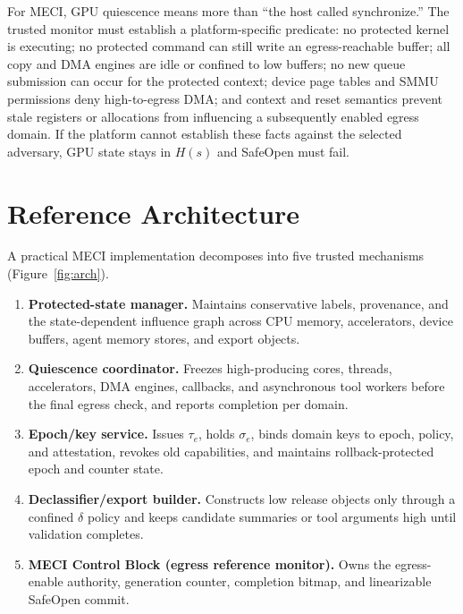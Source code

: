 \documentclass[11pt,letterpaper]{article}
\theoremstyle{plain}
\theoremstyle{definition}
\begin{document}
For MECI, GPU quiescence means more than ``the host called synchronize.'' The trusted monitor must establish a platform-specific predicate: no protected kernel is executing; no protected command can still write an egress-reachable buffer; all copy and DMA engines are idle or confined to low buffers; no new queue submission can occur for the protected context; device page tables and SMMU permissions deny high-to-egress DMA; and context and reset semantics prevent stale registers or allocations from influencing a subsequently enabled egress domain. If the platform cannot establish these facts against the selected adversary, GPU state stays in $H(s)$ and SafeOpen must fail.

\section{Reference Architecture}\label{sec:arch}

A practical MECI implementation decomposes into five trusted mechanisms (Figure~\ref{fig:arch}).
\begin{enumerate}[leftmargin=*,itemsep=1pt]
\item \textbf{Protected-state manager.} Maintains conservative labels, provenance, and the state-dependent influence graph across CPU memory, accelerators, device buffers, agent memory stores, and export objects.
\item \textbf{Quiescence coordinator.} Freezes high-producing cores, threads, accelerators, DMA engines, callbacks, and asynchronous tool workers before the final egress check, and reports completion per domain.
\item \textbf{Epoch/key service.} Issues $\tau_e$, holds $\sigma_e$, binds domain keys to epoch, policy, and attestation, revokes old capabilities, and maintains rollback-protected epoch and counter state.
\item \textbf{Declassifier/export builder.} Constructs low release objects only through a confined $\delta$ policy and keeps candidate summaries or tool arguments high until validation completes.
\item \textbf{MECI Control Block (egress reference monitor).} Owns the egress-enable authority, generation counter, completion bitmap, and linearizable SafeOpen commit.
\end{enumerate}
\end{document}
